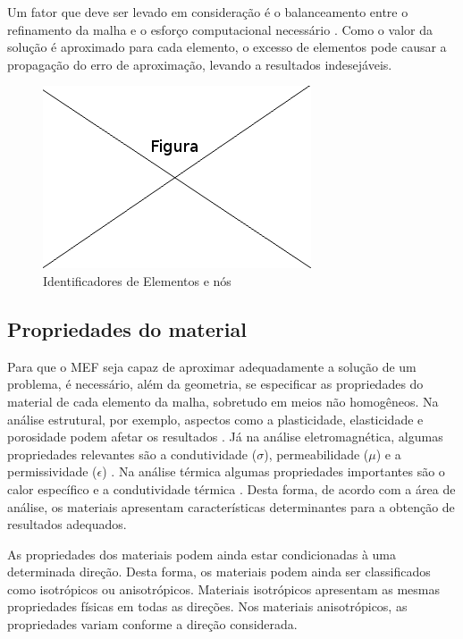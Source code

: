\documentclass[
    12pt,               %
    openright,          %
    oneside,
    a4paper,            %
    english,            %
    french,             %
    spanish,            %
    brazil              %
    ]{abntex2}
\begin{document}
Um fator que deve ser levado em consideração é o balanceamento entre o refinamento da malha e o esforço computacional necessário \cite[p. 154]{desai}. Como o valor da solução é aproximado para cada elemento, o excesso de elementos pode causar a propagação do erro de aproximação, levando a resultados indesejáveis.


\begin{figure}[!htb]
\centering
\includegraphics[scale=0.5]{figuras/temp.png}
\caption{Identificadores de Elementos e nós}
\label{fig:numeracao}
\end{figure}

\subsection{Propriedades do material}
Para que o MEF seja capaz de aproximar adequadamente a solução de um problema, é necessário, além da geometria, se especificar as propriedades do material de cada elemento da malha, sobretudo em meios não homogêneos. Na análise estrutural, por exemplo, aspectos como a plasticidade, elasticidade e porosidade podem afetar os resultados \cite[p. 250]{desai}. Já na análise eletromagnética, algumas propriedades relevantes são a condutividade ($\sigma$), permeabilidade ($\mu$) e a permissividade ($\epsilon$) \cite[p. 3]{volakis}. Na análise térmica algumas propriedades importantes são o calor específico e a condutividade térmica \cite[p. 251]{desai}.
Desta forma, de acordo com a área de análise, os materiais apresentam características determinantes para a obtenção de resultados adequados.

As propriedades dos materiais podem ainda estar condicionadas à uma determinada direção. Desta forma, os materiais podem ainda ser classificados como isotrópicos ou anisotrópicos\cite[p. 20]{sadiku}.  Materiais isotrópicos apresentam as mesmas propriedades físicas em todas as direções. Nos materiais anisotrópicos, as propriedades variam conforme a direção considerada.
\end{document}
